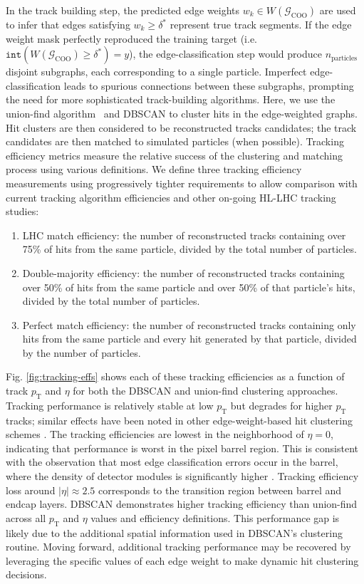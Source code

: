 \documentclass[twocolumn]{svjour3}
\newcommand{\pt}{\ensuremath{p_{\mathrm{T}}}\xspace}
\begin{document}
In the track building step, the predicted edge weights $w_k\in W(\mathcal{G}_\mathrm{COO})$ are used to infer that edges satisfying $w_k\geq\delta^*$ represent true track segments. 
If the edge weight mask perfectly reproduced the training target (i.e. $\mathtt{int}(W(\mathcal{G}_\mathrm{COO})\geq\delta^*)=y$), the edge-classification step would produce $n_\mathrm{particles}$ disjoint subgraphs, each corresponding to a single particle. 
Imperfect edge-classification leads to spurious connections between these subgraphs, prompting the need for more sophisticated track-building algorithms. 
Here, we use the union-find algorithm~\cite{unionfind} and DBSCAN to cluster hits in the edge-weighted graphs. 
Hit clusters are then considered to be reconstructed tracks candidates; the track candidates are then matched to simulated particles (when possible). 
Tracking efficiency metrics measure the relative success of the clustering and matching process using various definitions. 
We define three tracking efficiency measurements using progressively tighter requirements to allow comparison with current tracking algorithm efficiencies and other on-going HL-LHC tracking studies:
\begin{enumerate}
    \item LHC match efficiency: the number of reconstructed tracks containing over 75\% of hits from the same particle, divided by the total number of particles.
    \item Double-majority efficiency: the number of reconstructed tracks containing over 50\% of hits from the same particle and over 50\% of that particle's hits, divided by the total number of particles.
    \item Perfect match efficiency: the number of reconstructed tracks containing only hits from the same particle and every hit generated by that particle, divided by the number of particles.
\end{enumerate}
Fig. \ref{fig:tracking-effs} shows each of these tracking efficiencies as a function of track $\pt$ and $\eta$ for both the DBSCAN and union-find clustering approaches. 
Tracking performance is relatively stable at low $\pt$ but degrades for higher $\pt$ tracks; similar effects have been noted in other edge-weight-based hit clustering schemes \cite{Biscarat:2021dlj}. 
The tracking efficiencies are lowest in the neighborhood of $\eta=0$, indicating that performance is worst in the pixel barrel region.
This is consistent with the observation that most edge classification errors occur in the barrel, where the density of detector modules is significantly higher \cite{TrackML}. 
Tracking efficiency loss around $|\eta|\approx 2.5$ corresponds to the transition region between barrel and endcap layers. 
DBSCAN demonstrates higher tracking efficiency than union-find across all $\pt$ and $\eta$ values and efficiency definitions. 
This performance gap is likely due to the additional spatial information used in DBSCAN's clustering routine. 
Moving forward, additional tracking performance may be recovered by leveraging the specific values of each edge weight to make dynamic hit clustering decisions.
\end{document}
